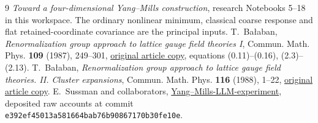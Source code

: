 \documentclass[11pt]{article}
\theoremstyle{remark}
\begin{document}
\begin{thebibliography}{9}
\emph{Toward a four-dimensional Yang--Mills construction},
research Notebooks 5--18 in this workspace. The ordinary nonlinear
minimum, classical coarse response and flat retained-coordinate
covariance are the principal inputs.
T.~Ba\l aban,
\emph{Renormalization group approach to lattice gauge field
theories I}, Commun. Math. Phys. \textbf{109} (1987), 249--301,
\href{https://scispace.com/pdf/renormalization-group-approach-to-lattice-gauge-field-3ygai0vxt1.pdf}{original article copy},
equations (0.11)--(0.16), (2.3)--(2.13).
T.~Ba\l aban,
\emph{Renormalization group approach to lattice gauge field
theories. II. Cluster expansions},
Commun. Math. Phys. \textbf{116} (1988), 1--22,
\href{https://scispace.com/pdf/renormalization-group-approach-to-lattice-gauge-field-4penm4k7hc.pdf}{original article copy}.
E.~Sussman and collaborators,
\href{https://github.com/ethanwsussman/Yang--Mills-LLM-experiment}{Yang--Mills-LLM-experiment},
deposited raw accounts at commit
\texttt{e392ef4501\allowbreak 3a581664ba\allowbreak b76b908671\allowbreak 70b30fe10e}.
\end{thebibliography}
\end{document}
